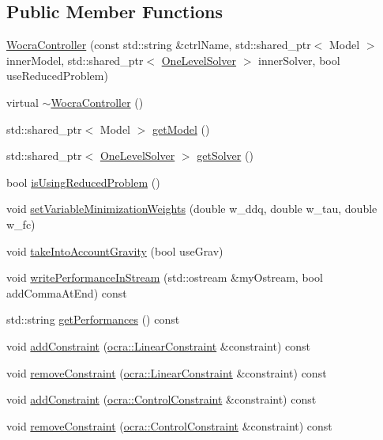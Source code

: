 \subsection*{Public Member Functions}
\begin{DoxyCompactItemize}
\item 
\hyperlink{classwocra_1_1WocraController_ae14fda387f6d308aead6ab7a59e82e74}{Wocra\+Controller} (const std\+::string \&ctrl\+Name, std\+::shared\+\_\+ptr$<$ Model $>$ inner\+Model, std\+::shared\+\_\+ptr$<$ \hyperlink{classocra_1_1OneLevelSolver}{One\+Level\+Solver} $>$ inner\+Solver, bool use\+Reduced\+Problem)
\item 
virtual \hyperlink{classwocra_1_1WocraController_a4051d9aab485cfa444ed90da795f2bb2}{$\sim$\+Wocra\+Controller} ()
\item 
std\+::shared\+\_\+ptr$<$ Model $>$ \hyperlink{classwocra_1_1WocraController_adc7f78b5f888c76a3296cfd5882caad1}{get\+Model} ()
\item 
std\+::shared\+\_\+ptr$<$ \hyperlink{classocra_1_1OneLevelSolver}{One\+Level\+Solver} $>$ \hyperlink{classwocra_1_1WocraController_a94f67ee0ae6985969f4f1798bde0a9db}{get\+Solver} ()
\item 
bool \hyperlink{classwocra_1_1WocraController_a89eab1194e0598d8b30730429f286450}{is\+Using\+Reduced\+Problem} ()
\item 
void \hyperlink{classwocra_1_1WocraController_a23b01d7dad39803132d69ae335212615}{set\+Variable\+Minimization\+Weights} (double w\+\_\+ddq, double w\+\_\+tau, double w\+\_\+fc)
\item 
void \hyperlink{classwocra_1_1WocraController_a339cb7de07b9766aba4b3d1cfd6a78d4}{take\+Into\+Account\+Gravity} (bool use\+Grav)
\item 
void \hyperlink{classwocra_1_1WocraController_a9b296a995ba10ef66cc4416f34f4b675}{write\+Performance\+In\+Stream} (std\+::ostream \&my\+Ostream, bool add\+Comma\+At\+End) const
\item 
std\+::string \hyperlink{classwocra_1_1WocraController_a4023613cae33e5f490babbc6d162204d}{get\+Performances} () const
\item 
void \hyperlink{classwocra_1_1WocraController_a45b43039b1d950ba59d569f24b6e265d}{add\+Constraint} (\hyperlink{namespaceocra_ae8b87cf4099be3efc3b410019ad2046e}{ocra\+::\+Linear\+Constraint} \&constraint) const
\item 
void \hyperlink{classwocra_1_1WocraController_ac1234e8084fedc0ed39e2ee97a40a31c}{remove\+Constraint} (\hyperlink{namespaceocra_ae8b87cf4099be3efc3b410019ad2046e}{ocra\+::\+Linear\+Constraint} \&constraint) const
\item 
void \hyperlink{classwocra_1_1WocraController_af6db65f470668d19bb7fd24821f042db}{add\+Constraint} (\hyperlink{classocra_1_1ControlConstraint}{ocra\+::\+Control\+Constraint} \&constraint) const
\item 
void \hyperlink{classwocra_1_1WocraController_a9a1b55fe0392b1514a813d4f9ed413b2}{remove\+Constraint} (\hyperlink{classocra_1_1ControlConstraint}{ocra\+::\+Control\+Constraint} \&constraint) const
\end{DoxyCompactItemize}
